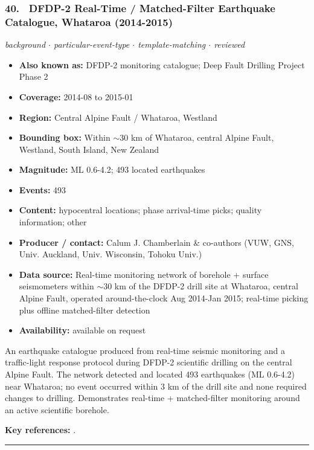 \documentclass[10pt,a4paper]{article}
\newcommand{\catentryrule}{\par\vspace{3pt}\noindent\textcolor{rulegrey}{\rule{\linewidth}{0.3pt}}\par\vspace{5pt}}
\newcommand{\kv}[2]{\item \textbf{#1:} #2}
\begin{document}
\subsubsection*{\hypertarget{c:40}{40.}~ DFDP-2 Real-Time / Matched-Filter Earthquake Catalogue, Whataroa (2014-2015)}
{\small\itshape background $\cdot$ particular-event-type $\cdot$ template-matching $\cdot$ reviewed}\par\vspace{2pt}
\begin{itemize}[leftmargin=1.3em,itemsep=0.6pt,topsep=1pt,parsep=0pt]
\kv{Also known as}{DFDP-2 monitoring catalogue; Deep Fault Drilling Project Phase 2}
\kv{Coverage}{2014-08 to 2015-01}
\kv{Region}{Central Alpine Fault / Whataroa, Westland}
\kv{Bounding box}{Within $\sim$30 km of Whataroa, central Alpine Fault, Westland, South Island, New Zealand}
\kv{Magnitude}{ML 0.6-4.2; 493 located earthquakes}
\kv{Events}{493}
\kv{Content}{hypocentral locations; phase arrival-time picks; quality information; other}
\kv{Producer / contact}{Calum J. Chamberlain \& co-authors (VUW, GNS, Univ. Auckland, Univ. Wisconsin, Tohoku Univ.)}
\kv{Data source}{Real-time monitoring network of borehole + surface seismometers within $\sim$30 km of the DFDP-2 drill site at Whataroa, central Alpine Fault, operated around-the-clock Aug 2014-Jan 2015; real-time picking plus offline matched-filter detection}
\kv{Availability}{available on request}
\end{itemize}
\par\vspace{2pt}An earthquake catalogue produced from real-time seismic monitoring and a traffic-light response protocol during DFDP-2 scientific drilling on the central Alpine Fault. The network detected and located 493 earthquakes (ML 0.6-4.2) near Whataroa; no event occurred within 3 km of the drill site and none required changes to drilling. Demonstrates real-time + matched-filter monitoring around an active scientific borehole.
\par\vspace{2pt}\textbf{Key references:} \cite{Chamberlain2017}.
\catentryrule
\end{document}
